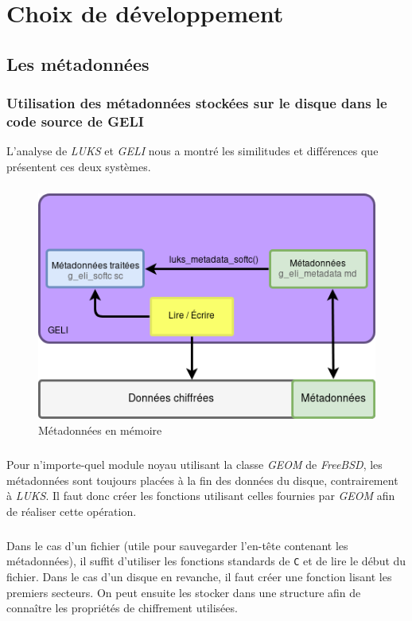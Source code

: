 \chapter{Choix de développement}

\section{Les métadonnées}
\subsection{Utilisation des métadonnées stockées sur le disque dans le code
source de GELI}
\label{ssec:md_usage}
L'analyse de \textit{LUKS} et \textit{GELI} nous a montré les similitudes et
différences que présentent ces deux systèmes.
\paragraph{}
\begin{figure}[h]
\centering
\includegraphics[width=.6\linewidth]{choix_developpement/utilisation_metadonnee.png}
\caption{\label{fig:softc_eli}Métadonnées en mémoire}
\end{figure}

\paragraph{}
Pour n'importe-quel module noyau utilisant la classe \textit{GEOM} de
\textit{FreeBSD}, les métadonnées sont toujours placées à la fin des données du
disque, contrairement à \textit{LUKS}. Il faut donc créer les fonctions
utilisant celles fournies par \textit{GEOM} afin de réaliser cette opération.
\paragraph{}
Dans le cas d'un fichier (utile pour sauvegarder l'en-tête contenant les 
métadonnées), il suffit d'utiliser les fonctions standards de
\verb|C| et de lire le début du fichier. Dans le cas d'un disque en revanche, il
faut créer une fonction lisant les premiers secteurs. On peut ensuite les
stocker dans une structure afin de connaître les propriétés de chiffrement
utilisées.

